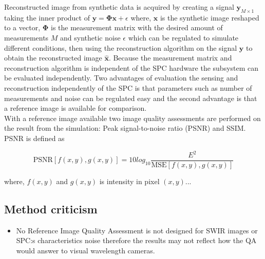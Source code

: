 Reconstructed image from synthetic data is acquired by creating a signal $ \mathbf{ y }_{M\times1}$ taking the inner product of $ \mathbf{y} = \mathbf{\Phi} \mathbf{x} + \epsilon$ where, $\mathbf{x}$ is the synthetic image reshaped to a vector, $\mathbf{\Phi}$ is the measurement matrix with the desired amount of measurements $M$ and synthetic noise $\epsilon$ which can be regulated to simulate different conditions, then using the reconstruction algorithm on the signal $\mathbf{y}$ to obtain the reconstructed image $\mathbf{\hat x}$. Because the measurement matrix and reconstruction algorithm is independent of the SPC hardware the subsystem can be evaluated independently. Two advantages of evaluation the sensing and reconstruction independently of the SPC is that parameters such as number of measurements and noise can be regulated easy and the second advantage is that a reference image is available for comparison.\\[0.1in] 

With a reference image available two image quality assessments are performed on the result from the simulation: Peak signal-to-noise ratio (PSNR) and  SSIM. PSNR is defined as

\begin{equation}
    \text{PSNR}[f(x,y),g(x,y)] = 10 log_{10}\frac{E^2}{\text{MSE}[f(x,y),g(x,y)]}
\end{equation}
 
where, $f(x,y)$ and $g(x,y)$ is intensity in pixel $(x,y)$...
 








\subsection{Method criticism}
\begin{itemize}
    \item No Reference Image Quality Assessment is not designed for SWIR images or SPC:s characteristics noise therefore the results may not reflect how the QA would answer to visual wavelength cameras. 
\end{itemize}

